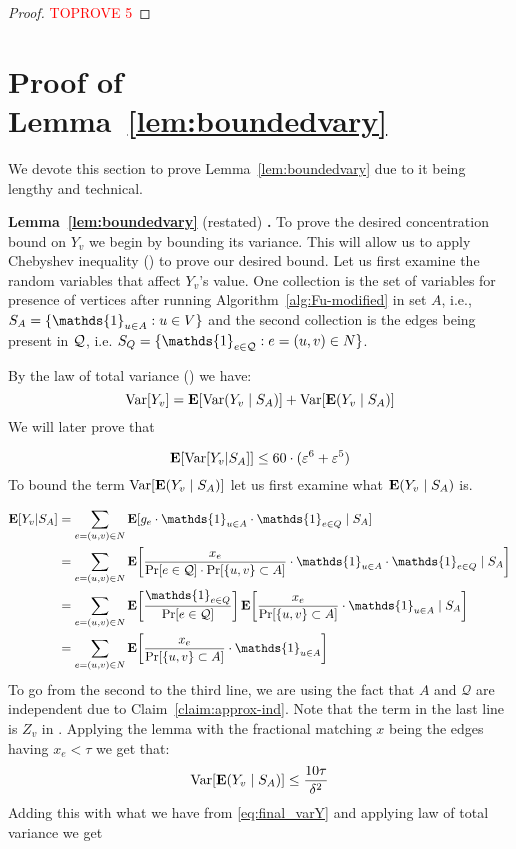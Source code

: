 \documentclass[letterpaper,11pt]{article}
\renewcommand{\epsilon}{\varepsilon}
\DeclareMathOperator{\E}{\ensuremath{\normalfont \textbf{E}}}
\newcommand{\mc}[1]{\ensuremath{\mathcal{#1}}}
\DeclareMathOperator{\var}{Var}
\renewcommand{\epsilon}[0]{\ensuremath{\varepsilon}}
\let\originalleft\left
\let\originalright\right
\renewcommand{\left}{\mathopen{}\mathclose\bgroup\originalleft}
\renewcommand{\right}{\aftergroup\egroup\originalright}
\renewcommand{\mc}[1]{\ensuremath{\mathcal{#1}}}
\newcommand{\restatelem}[2]{\noindent \textbf{Lemma~#1} (restated) \textbf{.} {\em #2}}
\begin{document}
\newcommand{\gstar}{\ensuremath{\mathcal{G}}\xspace}

\begin{proof}\textcolor{red}{TOPROVE 5}\end{proof} \section{Proof of Lemma~\ref{lem:boundedvary}}\label{sec:prooflemma}

We devote this section to prove Lemma~\ref{lem:boundedvary} due to it being lengthy and technical. 





\restatelem{\ref{lem:boundedvary}}{\lemboundedy{}}
To prove the desired concentration bound on $Y_v$ we begin by bounding its variance. This will allow us to apply Chebyshev inequality () to prove our desired bound. Let us first examine the random variables that affect $Y_v$'s value.
One collection is the set of variables for presence of vertices after running Algorithm~\ref{alg:Fu-modified} in set $A$, i.e., $\rva = \{\mathds{1}_{u \in A} :  u\in V  \} $ and the second collection is the edges being present in $\mathcal{Q}$, i.e. $\rvq = \{\mathds{1}_{e \in \qstar} : e = (u, v) \in N \}$. 

By the law of total variance () we have: 
$$\var[Y_v] = \E[\var(Y_v\mid S_A)] + \var[\E(Y_v \mid S_A)]$$
We will later prove that 

\begin{equation}\label{eq:final_varY}
\E[\var[Y_v | S_A]] \leq 60 \cdot (\epsilon^{6} + \epsilon^{5})
\end{equation}
To bound the term $\var[\E(Y_v\mid S_A)]$ let us first examine what $\E(Y_v\mid S_A)$ is. 

\begin{align*}
\E[Y_v|S_A] & = \sum_{e = (u, v) \in N} \E[g_e \cdot \mathds{1}_{u \in A} \cdot \mathds{1}_{e \in Q} \mid S_A] \\ & = \sum_{e = (u, v) \in N} \E\left[\frac{x_e}{\Pr[e \in \mathcal{Q}] \cdot \Pr[\{u, v\} \subset A]} \cdot \mathds{1}_{u \in A} \cdot \mathds{1}_{e \in Q} \mid S_A\right] \\
& = \sum_{e = (u, v) \in N} \E\left[\frac{\mathds{1}_{e \in Q}}{\Pr[e \in \mathcal{Q}]}\right] \E\left[\frac{x_e}{\Pr[\{u, v\} \subset A]} \cdot \mathds{1}_{u \in A} \mid S_A\right] \\
& = \sum_{e = (u, v) \in N} \E\left[\frac{x_e}{\Pr[\{u, v\} \subset A]} \cdot \mathds{1}_{u \in A}\right]
\end{align*}
To go from the second to the third line, we are using the fact that $A$ and $\mc{Q}$ are independent due to Claim~\ref{claim:approx-ind}.
Note that the term in the last line is $Z_v$ in .
Applying  the lemma with the fractional matching $x$ being the edges having $x_e < \tau$ we get that: 
$$\var[\E(Y_v\mid S_A)] \leq \frac{10\tau}{\delta^2}$$
Adding this with what we have from \cref{eq:final_varY} and applying law of total variance we get
\end{document}
